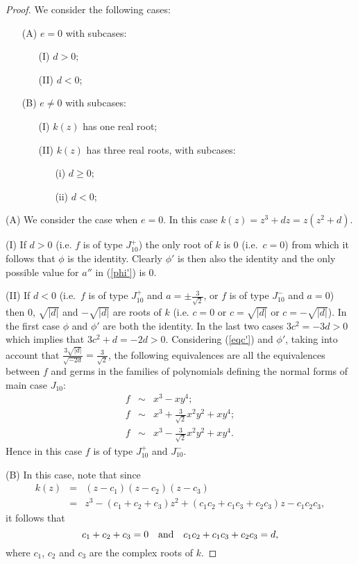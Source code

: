 \documentclass[noend]{amsproc}
\theoremstyle{definition}
\begin{document}
\begin{proof}
We consider the following cases:
\begin{itemize}
\item[(A)] $e=0$ with subcases:
\begin{itemize}
\item[(I)]$d>0$;
\item[(II)]$d<0$;
\end{itemize}
\item[(B)] $e\neq 0$ with subcases:
\begin{itemize}
\item[(I)]$k(z)$ has one real root;
\item[(II)]$k(z)$ has three real roots, with subcases:
\begin{itemize}
\item[(i)] $d\ge 0$;
\item[(ii)] $d<0$;
\end{itemize}
\end{itemize}
\end{itemize}

(A) We consider the case when $e=0$. In this case $k(z)=z^3+dz=z(z^2+d)$.

(I) If $d>0$ (i.e. $f$ is of type $J_{10}^+$) the only root of $k$ is $0$ (i.e.~$c=0$) from which it follows that $\phi$ is the identity. Clearly $\phi'$ is then also the identity and the only possible value for $a''$ in (\ref{phi'}) is $0$.

(II) If $d<0$ (i.e.~$f$ is of type $J_{10}^+$ and $a=\pm\frac{3}{\sqrt{2}}$, or $f$ is of type $J_{10}^-$ and $a=0$) then $0$, $\sqrt{|d|}$ and $-\sqrt{|d|}$ are roots of $k$ (i.e. $c=0$ or $c=\sqrt{|d|}$ or $c=-\sqrt{|d|}$). In the first case $\phi$ and $\phi'$ are both the identity. In the last two cases $3c^2=-3d>0$ which implies that $3c^2+d=-2d>0$. Considering (\ref{eqc'}) and $\phi'$, taking into account that $\frac{3\sqrt{|d|}}{\sqrt{-2d}}=\frac{3}{\sqrt{2}}$, the following equivalences are all the equivalences between $f$ and germs in the families of polynomials defining the normal forms of main case $J_{10}$:
\begin{eqnarray*}
f&\sim&x^3-xy^4;\\
f&\sim&x^3+\frac{3}{\sqrt{2}}x^2y^2+xy^4;\\
f&\sim&x^3-\frac{3}{\sqrt{2}}x^2y^2+xy^4.
\end{eqnarray*} 
 Hence in this case $f$ is of type $J_{10}^+$ and $J_{10}^-$.

(B) In this case, note that since
\begin{eqnarray*}
k(z)&=&(z-c_1)(z-c_2)(z-c_3)\\
&=&z^3-(c_1+c_2+c_3)z^2+(c_1c_2+c_1c_3+c_2c_3)z-c_1c_2c_3,
\end{eqnarray*}
it follows that
\begin{equation}\label{RelationOfRoots}
c_1+c_2+c_3=0\quad\textnormal{and}\quad c_1c_2+c_1c_3+c_2c_3=d,
\end{equation}
where $c_1$, $c_2$ and $c_3$ are the complex roots of $k$.


\end{proof}
\end{document}
